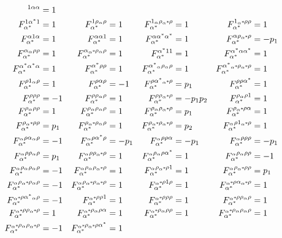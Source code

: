 {\begin{align}
^{1\alpha\alpha}&=1\\F_{\alpha^*}^{1\alpha^*1}&=1&F_{\alpha^*}^{1\rho{}_\alpha\rho}&=1&F_{\alpha^*}^{1{}_\alpha\rho\alphastarrho}&=1&F_{\alpha^*}^{1\alphastarrho\rho}&=1\\F_{\alpha^*}^{\alpha1\alpha}&=1&F_{\alpha^*}^{\alpha\alpha1}&=1&F_{\alpha^*}^{\alpha\alpha^*\alpha^*}&=1&F_{\alpha^*}^{\alpha\rho\alphastarrho}&=-p_1\\F_{\alpha^*}^{\alpha{}_\alpha\rho\rho}&=1&F_{\alpha^*}^{\alpha\alphastarrho{}_\alpha\rho}&=1&F_{\alpha^*}^{\alpha^*11}&=1&F_{\alpha^*}^{\alpha^*\alpha\alpha^*}&=1\\F_{\alpha^*}^{\alpha^*\alpha^*\alpha}&=1&F_{\alpha^*}^{\alpha^*\rho\rho}&=1&F_{\alpha^*}^{\alpha^*{}_\alpha\rho{}_\alpha\rho}&=1&F_{\alpha^*}^{\alpha^*\alphastarrho\alphastarrho}&=1\\F_{\alpha^*}^{\rho1{}_\alpha\rho}&=1&F_{\alpha^*}^{\rho\alpha\rho}&=-1&F_{\alpha^*}^{\rho\alpha^*\alphastarrho}&=p_1&F_{\alpha^*}^{\rho\rho\alpha^*}&=1\\F_{\alpha^*}^{\rho\rho\rho}&=-1&F_{\alpha^*}^{\rho\rho{}_\alpha\rho}&=1&F_{\alpha^*}^{\rho\rho\alphastarrho}&=-p_1p_2&F_{\alpha^*}^{\rho{}_\alpha\rho1}&=1\\F_{\alpha^*}^{\rho{}_\alpha\rho\rho}&=1&F_{\alpha^*}^{\rho{}_\alpha\rho{}_\alpha\rho}&=1&F_{\alpha^*}^{\rho{}_\alpha\rho\alphastarrho}&=p_1&F_{\alpha^*}^{\rho\alphastarrho\alpha}&=1\\F_{\alpha^*}^{\rho\alphastarrho\rho}&=p_1&F_{\alpha^*}^{\rho\alphastarrho{}_\alpha\rho}&=1&F_{\alpha^*}^{\rho\alphastarrho\alphastarrho}&=p_2&F_{\alpha^*}^{{}_\alpha\rho1\alphastarrho}&=1\\F_{\alpha^*}^{{}_\alpha\rho\alpha{}_\alpha\rho}&=-1&F_{\alpha^*}^{{}_\alpha\rho\alpha^*\rho}&=-p_1&F_{\alpha^*}^{{}_\alpha\rho\rho\alpha}&=-p_1&F_{\alpha^*}^{{}_\alpha\rho\rho\rho}&=-p_1\\F_{\alpha^*}^{{}_\alpha\rho\rho{}_\alpha\rho}&=p_1&F_{\alpha^*}^{{}_\alpha\rho\rho\alphastarrho}&=1&F_{\alpha^*}^{{}_\alpha\rho{}_\alpha\rho\alpha^*}&=1&F_{\alpha^*}^{{}_\alpha\rho{}_\alpha\rho\rho}&=-1\\F_{\alpha^*}^{{}_\alpha\rho{}_\alpha\rho{}_\alpha\rho}&=-1&F_{\alpha^*}^{{}_\alpha\rho{}_\alpha\rho\alphastarrho}&=1&F_{\alpha^*}^{{}_\alpha\rho\alphastarrho1}&=1&F_{\alpha^*}^{{}_\alpha\rho\alphastarrho\rho}&=p_1\\F_{\alpha^*}^{{}_\alpha\rho\alphastarrho{}_\alpha\rho}&=-1&F_{\alpha^*}^{{}_\alpha\rho\alphastarrho\alphastarrho}&=1&F_{\alpha^*}^{\alphastarrho1\rho}&=1&F_{\alpha^*}^{\alphastarrho\alpha\alphastarrho}&=1\\F_{\alpha^*}^{\alphastarrho\alpha^*{}_\alpha\rho}&=-1&F_{\alpha^*}^{\alphastarrho\rho1}&=1&F_{\alpha^*}^{\alphastarrho\rho\rho}&=1&F_{\alpha^*}^{\alphastarrho\rho{}_\alpha\rho}&=1\\F_{\alpha^*}^{\alphastarrho\rho\alphastarrho}&=1&F_{\alpha^*}^{\alphastarrho{}_\alpha\rho\alpha}&=1&F_{\alpha^*}^{\alphastarrho{}_\alpha\rho\rho}&=1&F_{\alpha^*}^{\alphastarrho{}_\alpha\rho{}_\alpha\rho}&=1\\F_{\alpha^*}^{\alphastarrho{}_\alpha\rho\alphastarrho}&=-1&F_{\alpha^*}^{\alphastarrho\alphastarrho\alpha^*}&=1
\end{align}}
